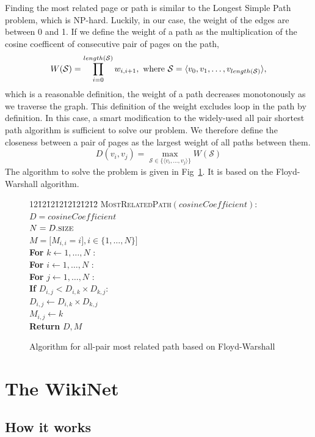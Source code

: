 \documentclass[12pt]{amsart}
\newcommand{\0}{\mat{0}}
\newcommand{\1}{\mathds{1}}
\newenvironment{code}{\begin{tabbing}
    12\=12\=12\=12\=12\=12\=12\=12\= \kill }
  {\end{tabbing}}
\begin{document}
Finding the most related page or path is similar to the Longest Simple Path problem, which is NP-hard. Luckily, in our case, the weight of the edges are between 0 and 1. If we define the weight of a path as the  multiplication of the cosine coefficent of consecutive pair of pages on the path, 
\[
W(\mathcal{S}) = \prod_{i = 0}^{length(\mathcal{S})}w_{i, i+1}, \hbox{ where } \mathcal{S}=\langle v_0, v_1, \dots, v_{length(\mathcal{S})} \rangle, 
\]
which is a reasonable definition, the weight of a path decreases monotonously as we traverse the graph. This definition of the weight excludes loop in the path by definition. In this case, a smart modification to the widely-used all pair shortest path algorithm is sufficient to solve our problem. We therefore define the closeness between a pair of pages as the largest weight of all paths between them.
\[
D(v_i,v_j) = \max_{\mathcal{S} \in \{\langle v_i, \dots, v_j \rangle \}} W(\mathcal{S}) 
\]
The algorithm to solve the problem is given in Fig~\ref{al:dist}. It is based on the Floyd-Warshall algorithm. 
\begin{figure}
\begin{code}
\textsc{MostRelatedPath}$(cosineCoefficient)$: \\
\> $D = cosineCoefficient$ \\
\> $N=D.\textsc{size}$ \\
\> $M = \big[ M_{i,i} =i \big], i\in\{1,\dots,N\}]$ \\
\> \textbf{For} $ k \leftarrow 1,\dots, N$ : \\
\>\> \textbf{For} $ i \leftarrow 1,\dots, N$ : \\
\>\>\> \textbf{For} $ j \leftarrow 1,\dots, N$ : \\
\>\>\>\> \textbf{If} $D_{i,j} < D_{i,k} \times D_{k,j} $: \\
\>\>\>\>\> $D_{i,j} \leftarrow D_{i,k} \times D_{k,j}$ \\
\>\>\>\>\> $M_{i,j} \leftarrow k $ \\
\> \textbf{Return} $D,M$
\end{code}
\caption{Algorithm for all-pair most related path based on Floyd-Warshall}
\label{al:dist}
\end{figure}


\section{The WikiNet}
\label{sec:wikinet}
\subsection{How it works}
\end{document}
